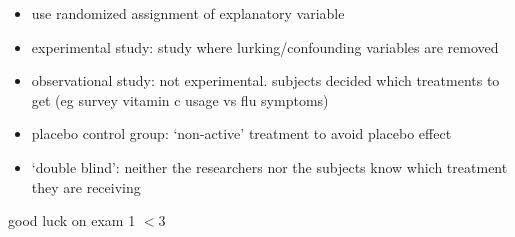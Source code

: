 \documentclass[11pt]{article}
\begin{document}
\begin{itemize}
\begin{itemize}
    \begin{itemize}
        \item use randomized assignment of explanatory variable
        \item experimental study: study where lurking/confounding variables are removed
        \item observational study: not experimental. subjects decided which treatments to get (eg survey vitamin c usage vs flu symptoms)
        \item placebo control group: `non-active' treatment to avoid placebo effect
        \item `double blind': neither the researchers nor the subjects know which treatment they are receiving
    \end{itemize}
  \end{itemize}
\end{itemize}
good luck on exam 1 $<$3
\end{document}
